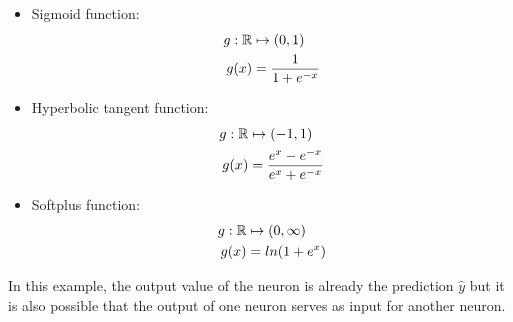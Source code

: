 \begin{itemize}
	\item Sigmoid function: 
		\begin{equation}
		\begin{split}
			g: \mathbb{R} 	& \mapsto (0,1) \\
			g(x) 	& = \frac{1}{1+e^{-x}} 
		\end{split}
		\end{equation}
	\item Hyperbolic tangent function: 
		\begin{equation}
		\begin{split}
			g: \mathbb{R} 	& \mapsto (-1,1) \\
			g(x) 	& = \frac{e^x - e^{-x}}{e^x + e^{-x}} 
		\end{split}
		\end{equation}	
	\item Softplus function: 
		\begin{equation}
		\begin{split}
			g: \mathbb{R} 	& \mapsto (0,\infty) \\
			g(x) 	& = ln(1 + e^x) 
		\end{split}
		\end{equation}	
\end{itemize}



In this example, the output value of the neuron is already the prediction $\hat{y}$ but it is also possible that the output of one neuron serves as input for another neuron.


